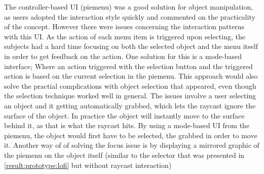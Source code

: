 The controller-based UI (piemenu) was a good solution for object manipulation, as users adopted the interaction style quickly and commented on the practicality of the concept. However there were issues concerning the interaction patterns with this UI. As the action of each menu item is triggered upon selecting, the subjects had a hard time focusing on both the selected object and the menu itself in order to get feedback on the action. One solution for this is a mode-based interface; Where an action triggered with the selection button and the triggered action is based on the current selection in the piemenu. This approach would also solve the practial complications with object selection that appeared, even though the selection technique worked well in general. The issues involve a user selecting an object and it getting automatically grabbed, which lets the raycast ignore the surface of the object. In practice the object will instantly move to the surface behind it, as that is what the raycast hits. By using a mode-based UI from the piemenu, the object would first have to be selected, the grabbed in order to move it. Another way of of solving the focus issue is by displaying a mirrored graphic of the piemenu on the object itself (similar to the selector that was presented in \ref{result:prototype:lofi} but without raycast interaction)

